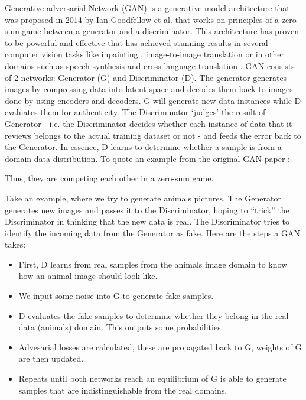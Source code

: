 \documentclass[12pt]{report}
\begin{document}
Generative adversarial Network (GAN) is a generative model architecture that was proposed in 2014 by Ian Goodfellow et al.\cite{gan} that works on principles of a zero-sum game between a generator and a discriminator. This architecture has proven to be powerful and effective that has achieved stunning results in several computer vision tasks like inpainting \cite{image-completion}, image-to-image translation \cite{cycle-gan} or in other domains such as speech synthesis \cite{audio-gan} and cross-language translation \cite{nlp}.
GAN consists of 2 networks: Generator (G) and Discriminator (D). The generator generates images by compressing data into latent space and decodes them back to images – done by using encoders and decoders. G will generate new data instances while D evaluates them for authenticity. The Discriminator ‘judges’ the result of Generator - i.e. the Discriminator decides whether each instance of data that it reviews belongs to the actual training dataset or not - and feeds the error back to the Generator. In essence, D learns to determine whether a sample is from a domain data distribution. To quote an example from the original GAN paper \cite{gan}:


Thus, they are competing each other in a zero-sum game.

Take an example, where we try to generate animals pictures. The Generator generates new images and passes it to the Discriminator, hoping to “trick” the Discriminator in thinking that the new data is real. The Discriminator tries to identify the incoming data from the Generator as fake.
Here are the steps a GAN takes:
\begin{itemize}
	\item First, D learns from real samples from the animals image domain to know how an animal image should look like.
	\item We input some noise into G to generate fake samples.
	\item D evaluates the fake samples to determine whether they belong in the real data (animals) domain. This outputs some probabilities. 
	\item Advesarial losses are calculated, these are propagated back to G, weights of G are then updated.
	\item Repeats until both networks reach an equilibrium of G is able to generate samples that are indistinguishable from the real domains.
\end{itemize}
\end{document}
